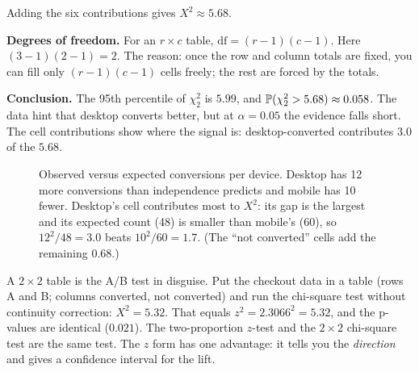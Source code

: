 Adding the six contributions gives $X^2 \approx 5.68$.

\textbf{Degrees of freedom.} For an $r\times c$ table, $\text{df} = (r-1)(c-1)$.
Here $(3-1)(2-1) = 2$. The reason: once the row and column totals are fixed,
you can fill only $(r-1)(c-1)$ cells freely; the rest are forced by the totals.

\textbf{Conclusion.} The 95th percentile of $\chi^2_2$ is $5.99$, and
$\P(\chi^2_2 > 5.68) \approx 0.058$. The data hint that desktop converts
better, but at $\alpha = 0.05$ the evidence falls short. The cell
contributions show where the signal is: desktop-converted contributes $3.0$ of
the $5.68$.

\begin{figure}[H]
\centering
{}
\caption{Observed versus expected conversions per device. Desktop has 12 more
conversions than independence predicts and mobile has 10 fewer. Desktop's cell
contributes most to $X^2$: its gap is the largest and its expected count (48)
is smaller than mobile's (60), so $12^2/48 = 3.0$ beats $10^2/60 = 1.7$. (The
``not converted'' cells add the remaining $0.68$.)}
\label{fig:cg-device}
\end{figure}

\begin{connectionbox}
A $2\times 2$ table is the A/B test in disguise. Put the checkout data in a
table (rows A and B; columns converted, not converted) and run the chi-square
test without continuity correction: $X^2 = 5.32$. That equals
$z^2 = 2.3066^2 = 5.32$, and the p-values are identical ($0.021$). The
two-proportion $z$-test and the $2\times 2$ chi-square test are the same test.
The $z$ form has one advantage: it tells you the \emph{direction} and gives a
confidence interval for the lift.
\end{connectionbox}

